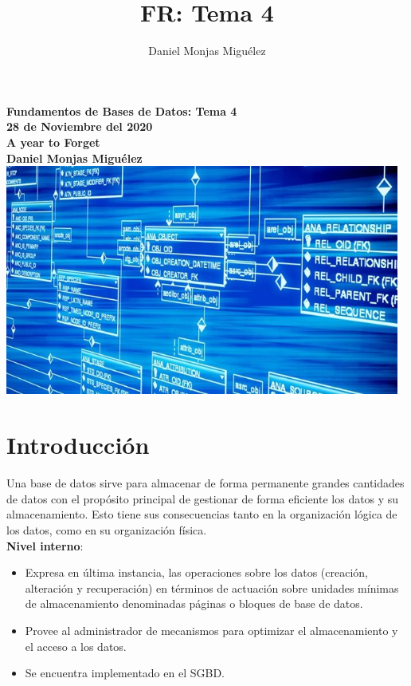 \documentclass[a4paper,11pt]{article}
\author{Daniel Monjas Miguélez}
\title{FR: Tema 4}
\begin{document}
\begin{titlepage}
\centering
    \vfill
    {\bfseries\Large
        Fundamentos de Bases de Datos: Tema 4\\
        28 de Noviembre del 2020\\
        A year to Forget \\
        \vskip2cm
        Daniel Monjas Miguélez\\
    }    
    \vfill
    \includegraphics[width=13cm]{bases_datos.jpg}
    \vfill
    \vfill
\end{titlepage}

\newpage
\tableofcontents
\newpage

\section{Introducción}

Una base de datos sirve para almacenar de forma permanente grandes cantidades de datos con el propósito principal de gestionar de forma eficiente los datos y su almacenamiento. Esto tiene sus consecuencias tanto en la organización lógica de los datos, como en su organización física. \\

\textbf{Nivel interno}:
\begin{itemize}
\item Expresa en última instancia, las operaciones sobre los datos (creación, alteración y recuperación) en términos de actuación sobre unidades mínimas de almacenamiento denominadas páginas o bloques de base de datos.

\item Provee al administrador de mecanismos para optimizar el almacenamiento y el acceso a los datos.

\item Se encuentra implementado en el SGBD.
\end{itemize}
\end{document}

